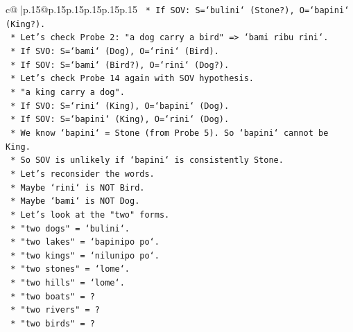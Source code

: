 \documentclass{article}
\begin{document}
{\begin{supertabular}{c@{$\;$}|p{.15\linewidth}@{}p{.15\linewidth}p{.15\linewidth}p{.15\linewidth}p{.15\linewidth}p{.15\linewidth}}
{{{\texttt{                            *   If SOV: S=`bulini` (Stone?), O=`bapini` (King?).} \\
\texttt{                            *   Let's check Probe 2: "a dog carry a bird" => `bami ribu rini`.} \\
\texttt{                            *   If SVO: S=`bami` (Dog), O=`rini` (Bird).} \\
\texttt{                            *   If SOV: S=`bami` (Bird?), O=`rini` (Dog?).} \\
\texttt{                            *   Let's check Probe 14 again with SOV hypothesis.} \\
\texttt{                                *   "a king carry a dog".} \\
\texttt{                                *   If SVO: S=`rini` (King), O=`bapini` (Dog).} \\
\texttt{                                *   If SOV: S=`bapini` (King), O=`rini` (Dog).} \\
\texttt{                                *   We know `bapini` = Stone (from Probe 5). So `bapini` cannot be King.} \\
\texttt{                                *   So SOV is unlikely if `bapini` is consistently Stone.} \\
\texttt{                            *   Let's reconsider the words.} \\
\texttt{                                *   Maybe `rini` is NOT Bird.} \\
\texttt{                                *   Maybe `bami` is NOT Dog.} \\
\texttt{                                *   Let's look at the "two" forms.} \\
\texttt{                                *   "two dogs" = `bulini`.} \\
\texttt{                                *   "two lakes" = `bapinipo po`.} \\
\texttt{                                *   "two kings" = `nilunipo po`.} \\
\texttt{                                *   "two stones" = `lome`.} \\
\texttt{                                *   "two hills" = `lome`.} \\
\texttt{                                *   "two boats" = ?} \\
\texttt{                                *   "two rivers" = ?} \\
\texttt{                                *   "two birds" = ?} \\
}}}
\end{supertabular}}
\end{document}
